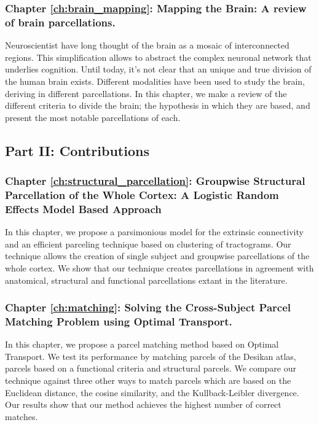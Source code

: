 \subsubsection{Chapter \ref{ch:brain_mapping}: Mapping the Brain: A review of brain parcellations.}
Neuroscientist have long thought of the brain as a mosaic of interconnected
regions. This simplification allows to abstract the complex neuronal network
that underlies cognition. Until today, it's not clear that an unique and true
division of the human brain exists. Different modalities have been used to
study the brain, deriving in different parcellations. In this chapter, we make
a review of the different criteria to divide the brain; the hypothesis in
which they are based, and present the most notable parcellations of each.

\subsection{Part II: Contributions}

\subsubsection{Chapter \ref{ch:structural_parcellation}: Groupwise Structural Parcellation of the Whole Cortex: A Logistic Random Effects Model Based Approach}
In this chapter, we propose a parsimonious model for the extrinsic connectivity
and an efficient parceling technique based on clustering of tractograms. 
Our technique allows the creation of single subject and groupwise parcellations
of the whole cortex. We show that our technique creates parcellations in
agreement with anatomical, structural and functional parcellations extant in 
the literature.

\subsubsection{Chapter \ref{ch:matching}: Solving the Cross-Subject Parcel Matching Problem using Optimal Transport.}
In this chapter, we propose a parcel matching method based on Optimal Transport.
We test its performance by matching parcels of the Desikan atlas, parcels based
on a functional criteria and structural parcels. We compare our technique against
three other ways to match parcels which are based on the Euclidean distance, the
cosine similarity, and the Kullback-Leibler divergence. Our results show that
our method achieves the highest number of correct matches.

